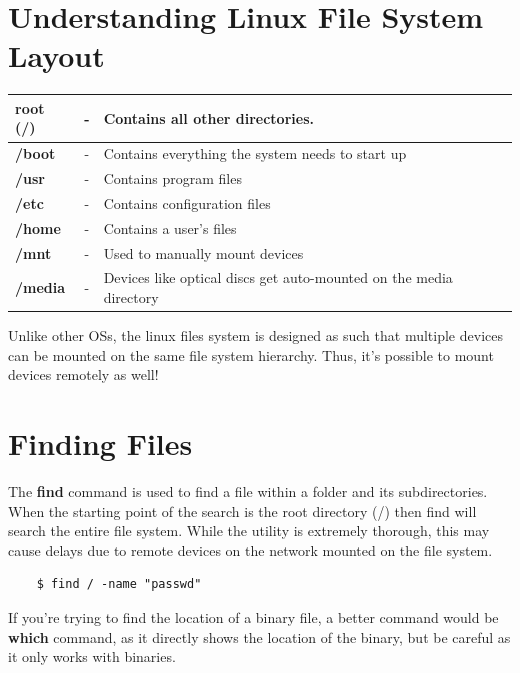 \documentclass{report}
\begin{document}
	\section{Understanding Linux File System Layout}
	\begin{tabular}{lcl}
		\toprule
		\textbf{root (/)} &- &Contains all other directories. \\
		\midrule
		\hspace{10pt}
		\textbf{/boot} &- &Contains everything the system needs to start up\\
		\hspace{10pt}
		\textbf{/usr} &- &Contains program files\\
		\hspace{10pt}
		\textbf{/etc} &- &Contains configuration files\\
		\hspace{10pt}
		\textbf{/home} &- &Contains a user's files\\
		\hspace{10pt}
		\textbf{/mnt} &- &Used to manually mount devices \\
		\hspace{10pt}
		\textbf{/media} &- &Devices like optical discs get auto-mounted on the media directory \\
		\bottomrule
	\end{tabular}

	\noindent
	Unlike other OSs, the linux files system is designed as such that multiple devices can be mounted on the same file system hierarchy. Thus, it's possible to mount devices remotely as well!
	
	\section{Finding Files}
	The \textbf{find} command is used to find a file within a folder and its subdirectories. When the starting point of the search is the root directory (/) then find will search the entire file system. While the utility is extremely thorough, this may cause delays due to remote devices on the network mounted on the file system. 
	
	\begin{verbatim}
	$ find / -name "passwd"
	\end{verbatim}
	
	\noindent
	If you're trying to find the location of a binary file, a better command would be \textbf{which} command, as it directly shows the location of the binary, but be careful as it only works with binaries.
	
\end{document}

